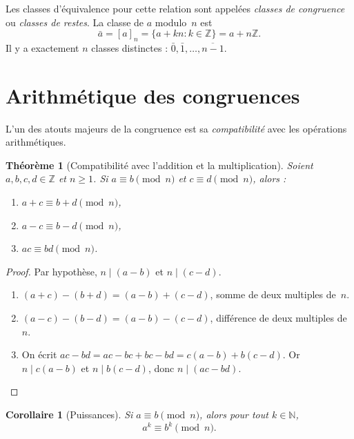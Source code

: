 \documentclass[12pt,a4paper,openany]{book}
\theoremstyle{definition}
\theoremstyle{plain}
\newtheorem{theoreme}[definition]{Théorème}
\newtheorem{corollaire}[definition]{Corollaire}
\theoremstyle{remark}
\newcommand{\N}{\mathbb{N}}
\newcommand{\Z}{\mathbb{Z}}
\begin{document}
Les classes d'équivalence pour cette relation sont appelées \emph{classes de
congruence} ou \emph{classes de restes}.
La classe de $a$ modulo~$n$ est
\[
  \bar{a} = [a]_n = \{ a + kn : k \in \Z \} = a + n\Z.
\]
Il y a exactement $n$ classes distinctes : $\bar{0}, \bar{1}, \ldots, \overline{n-1}$.

\section{Arithmétique des congruences}
\label{sec:cong-arith}

L'un des atouts majeurs de la congruence est sa \emph{compatibilité} avec les
opérations arithmétiques.

\begin{theoreme}[Compatibilité avec l'addition et la multiplication]
\label{thm:cong-compat}
Soient $a, b, c, d \in \Z$ et $n \geqslant 1$. Si $a \equiv b \pmod{n}$ et
$c \equiv d \pmod{n}$, alors :
\begin{enumerate}[label=(\roman*)]
  \item $a + c \equiv b + d \pmod{n}$,
  \item $a - c \equiv b - d \pmod{n}$,
  \item $ac \equiv bd \pmod{n}$.
\end{enumerate}
\end{theoreme}

\begin{proof}
Par hypothèse, $n \mid (a - b)$ et $n \mid (c - d)$.
\begin{enumerate}[label=(\roman*)]
  \item $(a + c) - (b + d) = (a - b) + (c - d)$, somme de deux multiples de~$n$.
  \item $(a - c) - (b - d) = (a - b) - (c - d)$, différence de deux multiples de~$n$.
  \item On écrit $ac - bd = ac - bc + bc - bd = c(a - b) + b(c - d)$.
    Or $n \mid c(a - b)$ et $n \mid b(c - d)$, donc $n \mid (ac - bd)$.
    \qedhere
\end{enumerate}
\end{proof}

\begin{corollaire}[Puissances]
\label{cor:cong-puiss}
Si $a \equiv b \pmod{n}$, alors pour tout $k \in \N$,
\[
  a^k \equiv b^k \pmod{n}.
\]
\end{corollaire}
\end{document}
